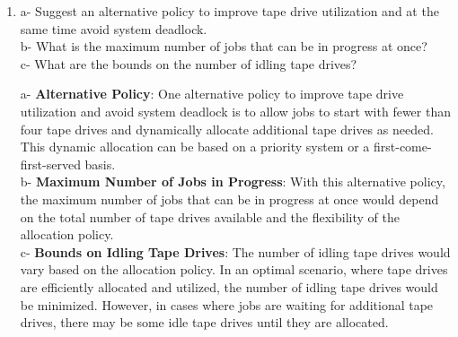 \documentclass[a4paper,12pt,fleqn]{article}
\begin{document}
\begin{enumerate}
\item
{
a- Suggest an alternative policy to improve tape drive utilization and at the same time avoid system deadlock.\\
b- What is the maximum number of jobs that can be in progress at once?\\
c- What are the bounds on the number of idling tape drives?\\
}
\begin{answer}
{
a- \textbf{Alternative Policy}: One alternative policy to improve tape drive utilization and avoid system deadlock is to allow jobs to start with fewer than four tape drives and dynamically allocate additional tape drives as needed. This dynamic allocation can be based on a priority system or a first-come-first-served basis.\\
b- \textbf{Maximum Number of Jobs in Progress}: With this alternative policy, the maximum number of jobs that can be in progress at once would depend on the total number of tape drives available and the flexibility of the allocation policy.\\
c- \textbf{Bounds on Idling Tape Drives}: The number of idling tape drives would vary based on the allocation policy. In an optimal scenario, where tape drives are efficiently allocated and utilized, the number of idling tape drives would be minimized. However, in cases where jobs are waiting for additional tape drives, there may be some idle tape drives until they are allocated.
}
\end{answer}

\end{enumerate}


\end{document}
